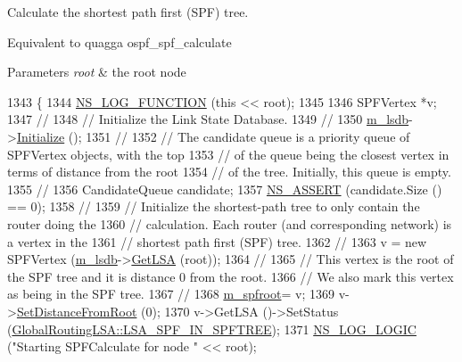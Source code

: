 Calculate the shortest path first (S\+PF) tree. 

Equivalent to quagga ospf\+\_\+spf\+\_\+calculate 
\begin{DoxyParams}{Parameters}
{\em root} & the root node \\
\hline
\end{DoxyParams}

\begin{DoxyCode}
1343 \{
1344   \hyperlink{log-macros-disabled_8h_a90b90d5bad1f39cb1b64923ea94c0761}{NS\_LOG\_FUNCTION} (\textcolor{keyword}{this} << root);
1345 
1346   SPFVertex *v;
1347 \textcolor{comment}{//}
1348 \textcolor{comment}{// Initialize the Link State Database.}
1349 \textcolor{comment}{//}
1350   \hyperlink{classns3_1_1GlobalRouteManagerImpl_a7e528f818fa3e6c794b07c0b3cba5f61}{m\_lsdb}->\hyperlink{classns3_1_1GlobalRouteManagerLSDB_a25ea9823747e40df5d43eb64100a5f85}{Initialize} ();
1351 \textcolor{comment}{//}
1352 \textcolor{comment}{// The candidate queue is a priority queue of SPFVertex objects, with the top}
1353 \textcolor{comment}{// of the queue being the closest vertex in terms of distance from the root}
1354 \textcolor{comment}{// of the tree.  Initially, this queue is empty.}
1355 \textcolor{comment}{//}
1356   CandidateQueue candidate;
1357   \hyperlink{assert_8h_a6dccdb0de9b252f60088ce281c49d052}{NS\_ASSERT} (candidate.Size () == 0);
1358 \textcolor{comment}{//}
1359 \textcolor{comment}{// Initialize the shortest-path tree to only contain the router doing the }
1360 \textcolor{comment}{// calculation.  Each router (and corresponding network) is a vertex in the}
1361 \textcolor{comment}{// shortest path first (SPF) tree.}
1362 \textcolor{comment}{//}
1363   v = \textcolor{keyword}{new} SPFVertex (\hyperlink{classns3_1_1GlobalRouteManagerImpl_a7e528f818fa3e6c794b07c0b3cba5f61}{m\_lsdb}->\hyperlink{classns3_1_1GlobalRouteManagerLSDB_a3504bf3573cc64a056835684c41e1aa5}{GetLSA} (root));
1364 \textcolor{comment}{// }
1365 \textcolor{comment}{// This vertex is the root of the SPF tree and it is distance 0 from the root.}
1366 \textcolor{comment}{// We also mark this vertex as being in the SPF tree.}
1367 \textcolor{comment}{//}
1368   \hyperlink{classns3_1_1GlobalRouteManagerImpl_a977f6b62ef1f1b58d041a2f49c093a1c}{m\_spfroot}= v;
1369   v->\hyperlink{classns3_1_1SPFVertex_a30885442cd0d8f7ae0e4690373b2c50a}{SetDistanceFromRoot} (0);
1370   v->GetLSA ()->SetStatus (\hyperlink{classns3_1_1GlobalRoutingLSA_a18bf63da580856fe1cc158aa855af1bda2a14fe5ba992deb9a1cb953f77ec8072}{GlobalRoutingLSA::LSA\_SPF\_IN\_SPFTREE});
1371   \hyperlink{group__logging_ga88acd260151caf2db9c0fc84997f45ce}{NS\_LOG\_LOGIC} (\textcolor{stringliteral}{"Starting SPFCalculate for node "} << root);

\end{DoxyCode}
